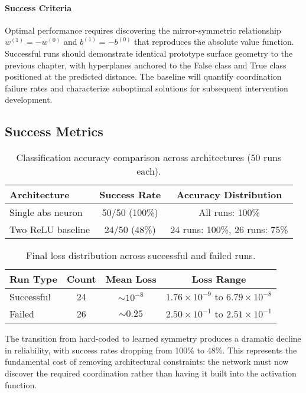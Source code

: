 \paragraph{Success Criteria}
Optimal performance requires discovering the mirror-symmetric relationship $w^{(1)} = -w^{(0)}$ and $b^{(1)} = -b^{(0)}$ that reproduces the absolute value function. Successful runs should demonstrate identical prototype surface geometry to the previous chapter, with hyperplanes anchored to the False class and True class positioned at the predicted distance. The baseline will quantify coordination failure rates and characterize suboptimal solutions for subsequent intervention development.


\subsection*{Success Metrics}

\begin{table}[ht]
\centering
\caption{Classification accuracy comparison across architectures (50 runs each).}
\label{tab:relu1-baseline-accuracy}
\begin{tabular}{lcc}
\toprule
Architecture & Success Rate & Accuracy Distribution \\
\midrule
Single abs neuron & 50/50 (100\%) & All runs: 100\% \\
Two ReLU baseline & 24/50 (48\%) & 24 runs: 100\%, 26 runs: 75\% \\
\bottomrule
\end{tabular}
\end{table}

\begin{table}[ht]
\centering
\caption{Final loss distribution across successful and failed runs.}
\label{tab:relu1-baseline-loss}
\begin{tabular}{lccc}
\toprule
Run Type & Count & Mean Loss & Loss Range \\
\midrule
Successful & 24 & $\sim10^{-8}$ & $1.76 \times 10^{-9}$ to $6.79 \times 10^{-8}$ \\
Failed & 26 & $\sim0.25$ & $2.50 \times 10^{-1}$ to $2.51 \times 10^{-1}$ \\
\bottomrule
\end{tabular}
\end{table}

The transition from hard-coded to learned symmetry produces a dramatic decline in reliability, with success rates dropping from 100\% to 48\%. This represents the fundamental cost of removing architectural constraints: the network must now discover the required coordination rather than having it built into the activation function.

